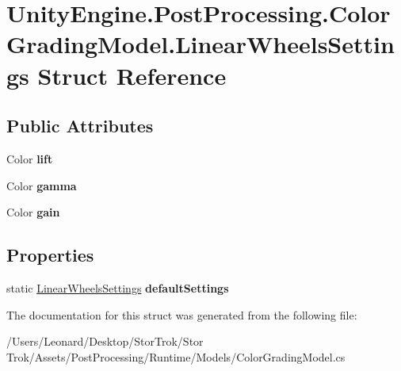 \hypertarget{struct_unity_engine_1_1_post_processing_1_1_color_grading_model_1_1_linear_wheels_settings}{}\section{Unity\+Engine.\+Post\+Processing.\+Color\+Grading\+Model.\+Linear\+Wheels\+Settings Struct Reference}
\label{struct_unity_engine_1_1_post_processing_1_1_color_grading_model_1_1_linear_wheels_settings}
\subsection*{Public Attributes}
\begin{DoxyCompactItemize}
\item 
\mbox{\label{struct_unity_engine_1_1_post_processing_1_1_color_grading_model_1_1_linear_wheels_settings_a6d552fe0196a7b47687cc7c7467f94ae}} 
Color {\bfseries lift}
\item 
\mbox{\label{struct_unity_engine_1_1_post_processing_1_1_color_grading_model_1_1_linear_wheels_settings_a7d58d6b75b02b9c32a17eadf61ca3be8}} 
Color {\bfseries gamma}
\item 
\mbox{\label{struct_unity_engine_1_1_post_processing_1_1_color_grading_model_1_1_linear_wheels_settings_a283b912d257aa47d32d41d0b03e1e4a2}} 
Color {\bfseries gain}
\end{DoxyCompactItemize}
\subsection*{Properties}
\begin{DoxyCompactItemize}
\item 
\mbox{\label{struct_unity_engine_1_1_post_processing_1_1_color_grading_model_1_1_linear_wheels_settings_a6f56229efcbc3784f78c253221883a70}} 
static \hyperlink{struct_unity_engine_1_1_post_processing_1_1_color_grading_model_1_1_linear_wheels_settings}{Linear\+Wheels\+Settings} {\bfseries default\+Settings}
\end{DoxyCompactItemize}


The documentation for this struct was generated from the following file\+:\begin{DoxyCompactItemize}
\item 
/\+Users/\+Leonard/\+Desktop/\+Stor\+Trok/\+Stor Trok/\+Assets/\+Post\+Processing/\+Runtime/\+Models/Color\+Grading\+Model.\+cs\end{DoxyCompactItemize}
